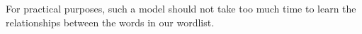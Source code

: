 \documentclass[6pt]{article}
\begin{document}
{%
%
%
%
%
%
%
%
%
%
%

%
%
%
%

For practical purposes, such a model should not take too much time to learn the relationships between the words in our wordlist. 

}
\end{document}
